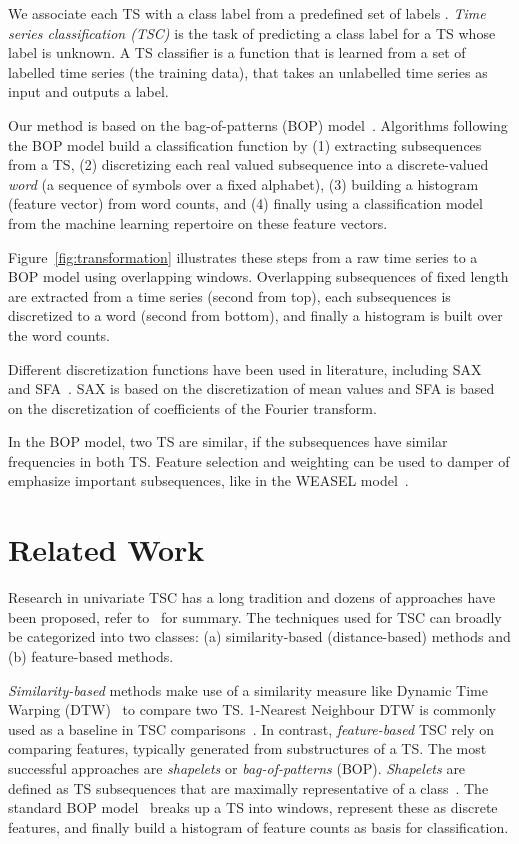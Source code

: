 \documentclass[sigconf]{acmart}
\begin{document}
We associate each TS with a class label  from a predefined set of labels . \emph{Time series classification (TSC)} is the task of predicting a class label for a TS whose label is unknown. A TS classifier is a function that is learned from a set of labelled time series (the training data), that takes an unlabelled time series as input and outputs a label. 

Our method is based on the bag-of-patterns (BOP) model~\cite{0001KL12,schafer2014boss,schafer2015scalable2}. Algorithms following the BOP model build a classification function by (1) extracting subsequences from a TS, (2) discretizing each real valued subsequence into a discrete-valued \emph{word} (a sequence of symbols over a fixed alphabet), (3) building a histogram (feature vector) from word counts, and (4) finally using a classification model from the machine learning repertoire on these feature vectors.

Figure~\ref{fig:transformation} illustrates these steps from a raw time series to a BOP model using overlapping windows. Overlapping subsequences of fixed length are extracted from a time series (second from top), each subsequences is discretized to a word (second from bottom), and finally a histogram is built over the word counts.

Different discretization functions have been used in literature, including SAX~\cite{Lin2007} and SFA~\cite{SchaferH12}. SAX is based on the discretization of mean values and SFA is based on the discretization of coefficients of the Fourier transform. 

In the BOP model, two TS are similar, if the subsequences have similar frequencies in both TS. Feature selection and weighting can be used to damper of emphasize important subsequences, like in the WEASEL model~\cite{schaefer2017weasel}.

\section{Related Work}

Research in univariate TSC has a long tradition and  dozens of approaches have been proposed, refer to~\cite{bagnall2016great,esling2012time,benchmarkingSchaefer17} for summary. The techniques used for TSC can broadly be categorized into two classes: (a) similarity-based (distance-based) methods and (b) feature-based methods. 

\emph{Similarity-based} methods make use of a similarity measure like Dynamic Time Warping (DTW)~\cite{rakthanmanon2012searching} to compare two TS. 1-Nearest Neighbour DTW is commonly used as a baseline in TSC comparisons~\cite{bagnall2016great}. In contrast, \emph{feature-based} TSC rely on comparing features, typically generated from substructures of a TS. The most successful approaches are \emph{shapelets} or \emph{bag-of-patterns} (BOP). \emph{Shapelets} are defined as TS subsequences that are maximally representative of a class~\cite{YeK09}. The standard BOP model~\cite{0001KL12} breaks up a TS into windows, represent these as discrete features, and finally build a histogram of feature counts as basis for classification. 
\end{document}
